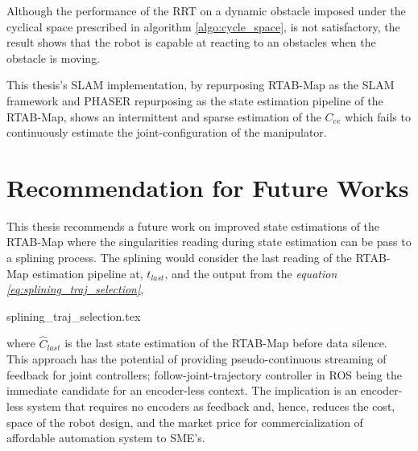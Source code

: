 Although the performance of the RRT on a dynamic 
obstacle imposed under the cyclical space prescribed in algorithm \ref{algo:cycle_space}, 
is not satisfactory, the result shows that the robot
is capable at reacting to an obstacles when the obstacle 
is moving.
    
    This thesis's SLAM implementation, by repurposing
RTAB-Map as the SLAM framework and PHASER repurposing as the state estimation pipeline of the RTAB-Map, 
shows an intermittent and sparse estimation of the $C_{ee}$ which fails to 
continuously estimate the joint-configuration of the manipulator. 


\section{Recommendation for Future Works}
This thesis recommends a future work on improved state estimations of the 
RTAB-Map where the singularities reading during state estimation can be pass to
a splining process. The splining would consider the last reading of the RTAB-Map 
estimation pipeline at, $t_{last}$, and the output from the 
\textit{equation \ref{eq:splining_traj_selection}},

{splining_traj_selection.tex}

where $\hat{C}_{last}$ is the last state estimation of the RTAB-Map before data silence.
This approach has the potential of providing pseudo-continuous streaming of feedback for
joint controllers; follow-joint-trajectory controller in ROS
being the immediate candidate for an encoder-less context. The implication
is an encoder-less system that requires no encoders as feedback and, hence, reduces
the cost, space of the robot design, and the market price for commercialization of
affordable automation system to SME's. 



